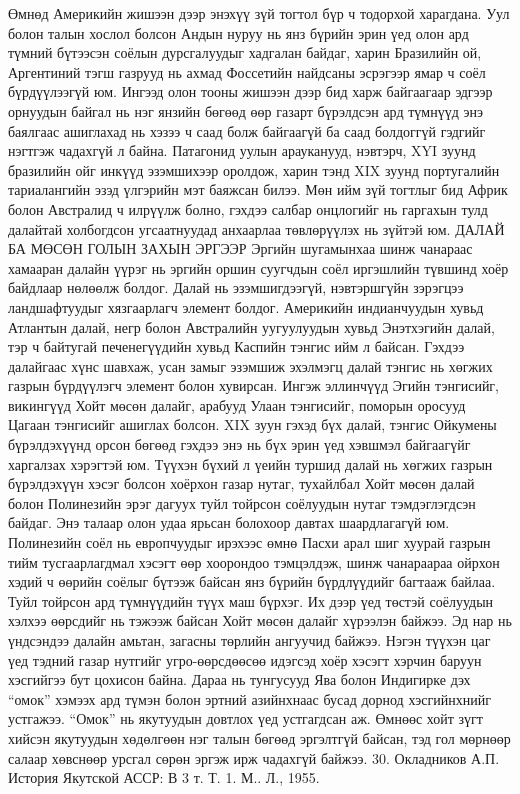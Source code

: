 Өмнөд Америкийн жишээн дээр энэхүү зүй тогтол бүр ч тодорхой харагдана. Уул болон талын хослол болсон Андын нуруу нь янз бүрийн эрин үед олон ард түмний бүтээсэн соёлын дурсгалуудыг хадгалан байдаг, харин Бразилийн ой, Аргентиний тэгш газрууд нь ахмад Фоссетийн найдсаны эсрэгээр ямар ч соёл бүрдүүлээгүй юм. Ингээд олон тооны жишээн дээр бид харж байгаагаар эдгээр орнуудын байгал нь нэг янзийн бөгөөд өөр газарт бүрэлдсэн ард түмнүүд энэ баялгаас ашиглахад нь хэзээ ч саад болж байгаагүй ба саад болдоггүй гэдгийг нэгтгэж чадахгүй л байна. Патагонид уулын арауканууд, нэвтэрч, XYI зуунд бразилийн ойг инкүүд эзэмшихээр оролдож, харин тэнд XIX зуунд португалийн тариалангийн эзэд үлгэрийн мэт баяжсан билээ.
Мөн ийм зүй тогтлыг бид Африк болон Австралид ч илрүүлж болно, гэхдээ салбар онцлогийг нь гаргахын тулд далайтай холбогдсон угсаатнуудад анхаарлаа төвлөрүүлэх нь зүйтэй юм.
ДАЛАЙ БА МӨСӨН ГОЛЫН ЗАХЫН ЭРГЭЭР
Эргийн шугамынхаа шинж чанараас хамааран далайн үүрэг нь эргийн оршин суугчдын соёл иргэшлийн түвшинд хоёр байдлаар нөлөөлж болдог. Далай нь эзэмшигдээгүй, нэвтэршгүйн зэрэгцээ ландшафтуудыг хязгаарлагч элемент болдог. Америкийн индианчуудын хувьд Атлантын далай, негр болон Австралийн уугуулуудын хувьд Энэтхэгийн далай, тэр ч байтугай печенегүүдийн хувьд Каспийн тэнгис ийм л байсан. Гэхдээ далайгаас хүнс шавхаж, усан замыг эзэмшиж эхэлмэгц далай тэнгис нь хөгжих газрын бүрдүүлэгч элемент болон хувирсан. Ингэж эллинчүүд Эгийн тэнгисийг, викингүүд Хойт мөсөн далайг, арабууд Улаан тэнгисийг, поморын оросууд Цагаан тэнгисийг ашиглах болсон. XIX зуун гэхэд бүх далай, тэнгис Ойкумены бүрэлдэхүүнд орсон бөгөөд гэхдээ энэ нь бүх эрин үед хэвшмэл байгаагүйг харгалзах хэрэгтэй юм. Түүхэн бүхий л үеийн туршид далай нь хөгжих газрын бүрэлдэхүүн хэсэг болсон хоёрхон газар нутаг, тухайлбал Хойт мөсөн далай болон Полинезийн эрэг дагуух туйл тойрсон соёлуудын нутаг тэмдэглэгдсэн байдаг. Энэ талаар олон удаа ярьсан болохоор давтах шаардлагагүй юм. Полинезийн соёл нь европчуудыг ирэхээс өмнө Пасхи арал шиг хуурай газрын тийм тусгаарлагдмал хэсэгт өөр хоорондоо тэмцэлдэж, шинж чанараараа ойрхон хэдий ч өөрийн соёлыг бүтээж байсан янз бүрийн бүрдлүүдийг багтааж байлаа.
Туйл тойрсон ард түмнүүдийн түүх маш бүрхэг. Их дээр үед төстэй соёлуудын хэлхээ өөрсдийг нь тэжээж байсан Хойт мөсөн далайг хүрээлэн байжээ. Эд нар нь үндсэндээ далайн амьтан, загасны төрлийн ангуучид байжээ. Нэгэн түүхэн цаг үед тэдний газар нутгийг угро-өөрсдөөсөө идэгсэд хоёр хэсэгт хэрчин баруун хэсгийгээ бут цохисон байна. Дараа нь тунгусууд Ява болон Индигирке дэх “омок” хэмээх ард түмэн болон эртний азийнхнаас бусад дорнод хэсгийнхнийг устгажээ. “Омок” нь якутуудын довтлох үед устгагдсан аж. Өмнөөс хойт зүгт хийсэн якутуудын хөдөлгөөн нэг талын бөгөөд эргэлтгүй байсан, тэд гол мөрнөөр салаар хөвснөөр урсгал сөрөн эргэж ирж чадахгүй байжээ. 30. Окладников А.П. История Якутской АССР: В 3 т. Т. 1. М.. Л., 1955.
